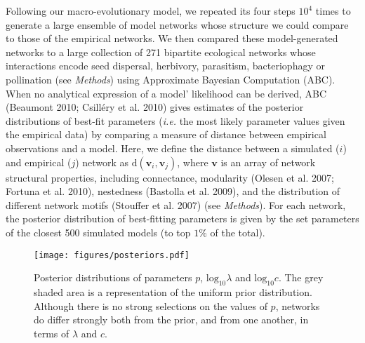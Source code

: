 \documentclass[12pt]{article}
\begin{document}
Following our macro-evolutionary model, we repeated its four steps
\(10^4\) times to generate a large ensemble of model networks whose
structure we could compare to those of the empirical networks. We then
compared these model-generated networks to a large collection of 271
bipartite ecological networks whose interactions encode seed dispersal,
herbivory, parasitism, bacteriophagy or pollination (see \emph{Methods})
using Approximate Bayesian Computation (ABC). When no analytical
expression of a model' likelihood can be derived, ABC (Beaumont 2010;
Csilléry et al. 2010) gives estimates of the posterior distributions of
best-fit parameters (\emph{i.e.} the most likely parameter values given
the empirical data) by comparing a measure of distance between empirical
observations and a model. Here, we define the distance between a
simulated (\(i\)) and empirical (\(j\)) network as
\(\text{d}(\mathbf{v}_i, \mathbf{v}_j)\), where \(\mathbf{v}\) is an
array of network structural properties, including connectance,
modularity (Olesen et al. 2007; Fortuna et al. 2010), nestedness
(Bastolla et al. 2009), and the distribution of different network motifs
(Stouffer et al. 2007) (see \emph{Methods}). For each network, the
posterior distribution of best-fitting parameters is given by the set
parameters of the closest 500 simulated models (to top \(1\%\) of the
total).

\begin{figure*}[bt]
    \centering
    \texttt{[image: figures/posteriors.pdf]}
    \caption[Posterior distributions of parameters $p$, $\lambda$ and $c$.]{Posterior distributions of parameters $p$, $\text{log}_{10}\lambda$ and $\text{log}_{10}c$. The grey shaded area is a representation of the uniform prior distribution. Although there is no strong selections on the values of $p$, networks do differ strongly both from the prior, and from one another, in terms of $\lambda$ and $c$.}
    \label{posteriors}
\end{figure*}
\end{document}
